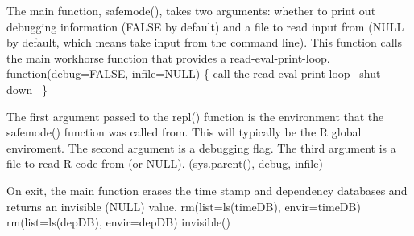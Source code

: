 \documentclass[a4paper]{article}%
\begin{document}
The main function, {\Tt{}safemode()\nwendquote},
takes two arguments: whether to print out debugging information
({\Tt{}FALSE\nwendquote} by default) and a file to read input from ({\Tt{}NULL\nwendquote} by default,
which means take input from the command line).  
This function
calls the main workhorse function that
provides a read-eval-print-loop.
\nwenddocs{}\endmoddef\nwstartdeflinemarkup{}\nwenddeflinemarkup
function(debug=FALSE, infile=NULL) \{
    \LA{}call the read-eval-print-loop~{\nwtagstyle{}}\RA{}
    \LA{}shut down~{\nwtagstyle{}}\RA{}
\}
\nwendcode{}%

The first
argument passed to the {\Tt{}repl()\nwendquote} function is the environment that
the {\Tt{}safemode()\nwendquote} function was called from.  This will typically
be the R global enviroment.  The second argument is a debugging flag.
The third argument is a file to read R code from (or {\Tt{}NULL\nwendquote}).
\nwenddocs{}\endmoddef\nwstartdeflinemarkup{}\nwenddeflinemarkup
{}(sys.parent(), debug, infile)
\nwendcode{}%

On exit, the main function erases the time stamp and dependency 
databases and returns an
invisible ({\Tt{}NULL\nwendquote}) value.
\nwenddocs{}\endmoddef\nwstartdeflinemarkup{}\nwenddeflinemarkup
rm(list=ls(timeDB), envir=timeDB)
rm(list=ls(depDB), envir=depDB)
invisible()
\nwendcode{}\nwdocspar
\end{document}
